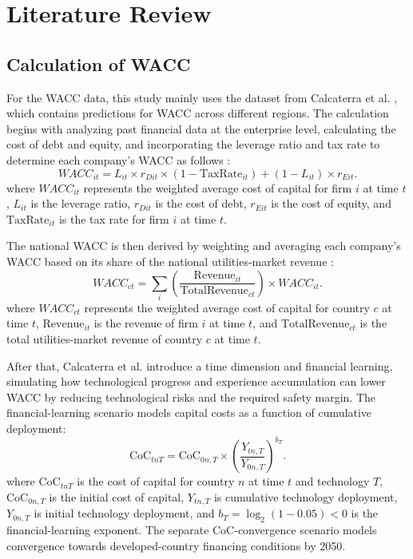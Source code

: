 \section{Literature Review}

\subsection{Calculation of WACC}

For the WACC data, this study mainly uses the dataset from Calcaterra et al. \cite{calcaterra2024reducing}, which contains predictions for WACC across different regions. The calculation begins with analyzing past financial data at the enterprise level, calculating the cost of debt and equity, and incorporating the leverage ratio and tax rate to determine each company's WACC as follows \cite{calcaterra2024reducing}:
\begin{equation}
WACC_{it}=L_{it}\times r_{Dit}\times (1-\mathrm{TaxRate}_{it})+(1-L_{it})\times r_{Eit}.
\end{equation}
where $WACC_{it}$ represents the weighted average cost of capital for firm $i$ at time $t$, $L_{it}$ is the leverage ratio, $r_{Dit}$ is the cost of debt, $r_{Eit}$ is the cost of equity, and $\mathrm{TaxRate}_{it}$ is the tax rate for firm $i$ at time $t$.

The national WACC is then derived by weighting and averaging each company's WACC based on its share of the national utilities-market revenue \cite{calcaterra2024reducing}:
\begin{equation}
WACC_{ct}=\sum_i\left(\frac{\mathrm{Revenue}_{it}}{\mathrm{TotalRevenue}_{ct}}\right)\times WACC_{it}.
\end{equation}
where $WACC_{ct}$ represents the weighted average cost of capital for country $c$ at time $t$, $\mathrm{Revenue}_{it}$ is the revenue of firm $i$ at time $t$, and $\mathrm{TotalRevenue}_{ct}$ is the total utilities-market revenue of country $c$ at time $t$.

After that, Calcaterra et al. \cite{calcaterra2024reducing} introduce a time dimension and financial learning, simulating how technological progress and experience accumulation can lower WACC by reducing technological risks and the required safety margin. The financial-learning scenario models capital costs as a function of cumulative deployment:
\begin{equation}
\mathrm{CoC}_{tnT}=\mathrm{CoC}_{0n,T}\times\left(\frac{Y_{tn,T}}{Y_{0n,T}}\right)^{b_T}.
\end{equation}
where $\mathrm{CoC}_{tnT}$ is the cost of capital for country $n$ at time $t$ and technology $T$, $\mathrm{CoC}_{0n,T}$ is the initial cost of capital, $Y_{tn,T}$ is cumulative technology deployment, $Y_{0n,T}$ is initial technology deployment, and $b_T=\log_2(1-0.05)<0$ is the financial-learning exponent. The separate CoC-convergence scenario models convergence towards developed-country financing conditions by 2050.

